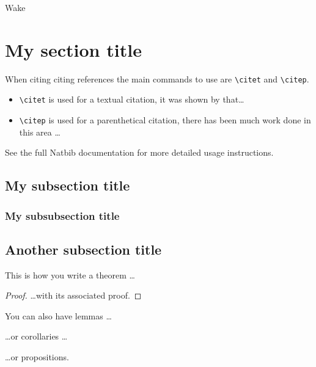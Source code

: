 \begin{chapter}{\label{cha:wake}Wake}

  \section{\label{sec:a_label}My section title}
  When citing citing references the main commands to use are \verb"\citet" and
  \verb"\citep".

  \begin{itemize}
    \item \verb"\citet" is used for a textual citation, \eg it was shown by
      \citet{Cha61} that\ldots
    \item \verb"\citep" is used for a parenthetical citation, \eg there has
      been much work done in this area \citep[see, for
      example,][]{Tay23,Don64}\ldots
  \end{itemize}

  \noindent See the full Natbib documentation for more detailed usage
  instructions.

  \subsection{\label{subsec:another_label}My subsection title}

  \subsubsection{\label{sssec:yet_another_label}My subsubsection title}

  \subsection{\label{subsec:some_other_label}Another subsection title}
  \begin{theorem}
    This is how you write a theorem \ldots
  \end{theorem}
  \begin{proof}
    \ldots with its associated proof.
  \end{proof}

  \begin{lemma}
    You can also have lemmas \ldots
  \end{lemma}

  \begin{corollary}
    \ldots or corollaries \ldots
  \end{corollary}

  \begin{proposition}
    \dots or propositions.
  \end{proposition}


\end{chapter}
